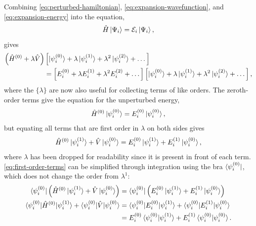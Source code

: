 \documentclass[%
class = book,%
crop = false,%
float = true,%
multi = true,%
preview = false,%
]{standalone}
\begin{document}
Combining \eqref{eq:perturbed-hamiltonian}, \eqref{eq:expansion-wavefunction}, and \eqref{eq:expansion-energy} into the \schrod{} equation,
\begin{equation}
  \label{eq:schrodinger-equation}
  \hat{H}\ket{\Psi_{i}} = \mathcal{E}_{i}\ket{\Psi_{i}},
\end{equation}
gives
\begin{equation}
  \label{eq:expansion-schrodinger}
  \begin{aligned}
    \left( \hat{H}^{(0)} + \lambda\hat{V} \right) &\left[ \ket{\psi_{i}^{(0)}} + \lambda\ket{\psi_{i}^{(1)}} + \lambda^{2}\ket{\psi_{i}^{(2)}} + \dots \right] \\
    &= \left[ E_{i}^{(0)} + \lambda E_{i}^{(1)} + \lambda^{2} E_{i}^{(2)} + \dots \right] \left[ \ket{\psi_{i}^{(0)}} + \lambda\ket{\psi_{i}^{(1)}} + \lambda^{2}\ket{\psi_{i}^{(2)}} + \dots \right],
  \end{aligned}
\end{equation}
where the \(\{\lambda\}\) are now also useful for collecting terms of like orders. The zeroth-order terms give the \schrod{} equation for the unperturbed energy,
\begin{equation}
  \label{eq:unperturbed-energy}
  \hat{H}^{(0)} \ket{\psi_{i}^{(0)}} = E_{i}^{(0)} \ket{\psi_{i}^{(0)}},
\end{equation}
but equating all terms that are first order in \(\lambda\) on both sides gives
\begin{equation}
  \label{eq:first-order-terms}
  \hat{H}^{(0)} \ket{\psi_{i}^{(1)}} + \hat{V} \ket{\psi_{i}^{(0)}} = E_{i}^{(0)} \ket{\psi_{i}^{(1)}} + E_{i}^{(1)} \ket{\psi_{i}^{(0)}},
\end{equation}
where \(\lambda\) has been dropped for readability since it is present in front of each term. \eqref{eq:first-order-terms} can be simplified through integration using the bra \(\bra{\psi_{i}^{(0)}}\), which does not change the order from \(\lambda^{1}\):
\begin{equation}
  \label{eq:first-order-terms-bra}
  \begin{aligned}
    \bra{\psi_{i}^{(0)}} \left( \hat{H}^{(0)} \ket{\psi_{i}^{(1)}} + \hat{V} \ket{\psi_{i}^{(0)}} \right) &= \bra{\psi_{i}^{(0)}} \left( E_{i}^{(0)} \ket{\psi_{i}^{(1)}} + E_{i}^{(1)} \ket{\psi_{i}^{(0)}} \right) \\
    \braket{\psi_{i}^{(0)} | \hat{H}^{(0)} | \psi_{i}^{(1)}} + \braket{\psi_{i}^{(0)} | \hat{V} | \psi_{i}^{(0)}} &= \braket{\psi_{i}^{(0)} | E_{i}^{(0)} | \psi_{i}^{(1)}} + \braket{\psi_{i}^{(0)} | E_{i}^{(1)} | \psi_{i}^{(0)}} \\
    &= E_{i}^{(0)} \braket{\psi_{i}^{(0)} | \psi_{i}^{(1)}} + E_{i}^{(1)} \braket{\psi_{i}^{(0)} | \psi_{i}^{(0)}}.
  \end{aligned}
\end{equation}
\end{document}

